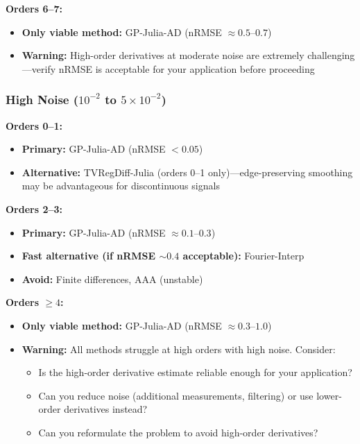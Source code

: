 \textbf{Orders 6--7:}
\begin{itemize}
    \item \textbf{Only viable method:} GP-Julia-AD (nRMSE $\approx 0.5$--$0.7$)
    \item \textbf{Warning:} High-order derivatives at moderate noise are extremely challenging—verify nRMSE is acceptable for your application before proceeding
\end{itemize}

\subsubsection{High Noise ($10^{-2}$ to $5 \times 10^{-2}$)}

\textbf{Orders 0--1:}
\begin{itemize}
    \item \textbf{Primary:} GP-Julia-AD (nRMSE $< 0.05$)
    \item \textbf{Alternative:} TVRegDiff-Julia (orders 0--1 only)—edge-preserving smoothing may be advantageous for discontinuous signals
\end{itemize}

\textbf{Orders 2--3:}
\begin{itemize}
    \item \textbf{Primary:} GP-Julia-AD (nRMSE $\approx 0.1$--$0.3$)
    \item \textbf{Fast alternative (if nRMSE $\sim 0.4$ acceptable):} Fourier-Interp
    \item \textbf{Avoid:} Finite differences, AAA (unstable)
\end{itemize}

\textbf{Orders $\geq 4$:}
\begin{itemize}
    \item \textbf{Only viable method:} GP-Julia-AD (nRMSE $\approx 0.3$--$1.0$)
    \item \textbf{Warning:} All methods struggle at high orders with high noise. Consider:
    \begin{itemize}
        \item Is the high-order derivative estimate reliable enough for your application?
        \item Can you reduce noise (additional measurements, filtering) or use lower-order derivatives instead?
        \item Can you reformulate the problem to avoid high-order derivatives?
    \end{itemize}
\end{itemize}

